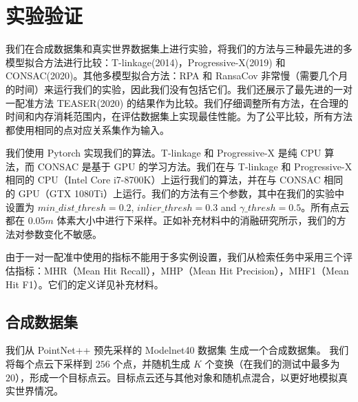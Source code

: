 %
%
%
%
%
%


\chapter{实验验证}


我们在合成数据集和真实世界数据集上进行实验，将我们的方法与三种最先进的多模型拟合方法进行比较：T-linkage(2014)\cite{Tlinkage}，Progressive-X(2019)\cite{ProgressiveX} 和 CONSAC(2020)\cite{CONSAC}。其他多模型拟合方法：RPA\cite{RPA} 和 RansaCov\cite{Coverage} 非常慢（需要几个月的时间）来运行我们的实验，因此我们没有包括它们。我们还展示了最先进的一对一配准方法 TEASER(2020)\cite{TEASER} 的结果作为比较。我们仔细调整所有方法，在合理的时间和内存消耗范围内，在评估数据集上实现最佳性能。为了公平比较，所有方法都使用相同的点对应关系集作为输入。

我们使用 Pytorch\cite{Pytorch} 实现我们的算法。T-linkage 和 Progressive-X 是纯 CPU 算法，而 CONSAC 是基于 GPU 的学习方法。我们在与 T-linkage 和 Progressive-X 相同的 CPU（Intel Core i7-8700K）上运行我们的算法，并在与 CONSAC 相同的 GPU（GTX 1080Ti）上运行。我们的方法有三个参数，其中在我们的实验中设置为 $min\_dist\_thresh=0.2$, $inlier\_thresh=0.3$ and $\gamma\_thresh=0.5$。所有点云都在 $0.05m$ 体素大小中进行下采样。正如补充材料中的消融研究所示，我们的方法对参数变化不敏感。

由于一对一配准中使用的指标不能用于多实例设置，我们从检索任务中采用三个评估指标：MHR（Mean Hit Recall），MHP（Mean Hit Precision），MHF1（Mean Hit F1）。它们的定义详见补充材料。

    
\section{合成数据集}
我们从 PointNet++\cite{pointnet2} 预先采样的 Modelnet40 数据集\cite{ModelNet40} 生成一个合成数据集。
我们将每个点云下采样到 $256$ 个点，并随机生成 $K$ 个变换（在我们的测试中最多为 $20$），形成一个目标点云。目标点云还与其他对象和随机点混合，以更好地模拟真实世界情况。
    
